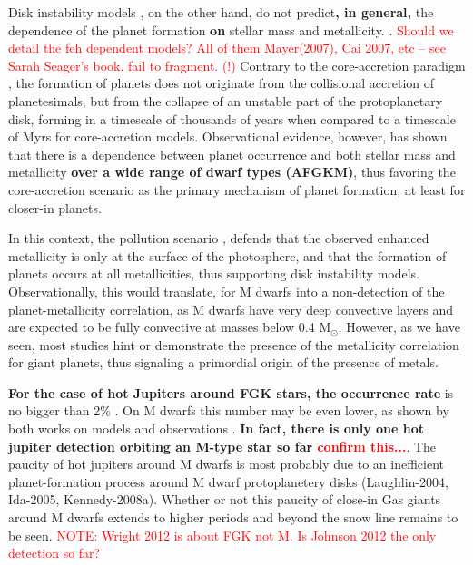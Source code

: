 \documentclass[structabstract]{aa}
\begin{document}
Disk instability models \citep[e.g.][]{Boss-1997}, on the other hand, do not predict\textbf{, in general,} the dependence of the planet formation \textbf{on} stellar mass \citep[e.g.][]{Boss-2006a} and metallicity. \citep{Boss-2002}. \textcolor{red}{Should we detail the feh dependent models? All of them Mayer(2007), Cai 2007, etc -- see Sarah Seager's book. fail to fragment. (!)}
Contrary to the core-accretion paradigm \citep{Pollack-1996}, the formation of planets does not originate from the collisional accretion of planetesimals, but from the collapse of an unstable part of the protoplanetary disk, forming in a timescale of thousands of years when compared to a timescale of Myrs for core-accretion models. Observational evidence, however, has shown that there is a dependence between planet occurrence and both stellar mass and metallicity \citep[e.g.][]{Johnson-2010} \textbf{over a wide range of dwarf types (AFGKM)}, thus favoring the core-accretion scenario as the primary mechanism of planet formation, at least for closer-in planets. 

In this context, the pollution scenario \citep[e.g.][]{Murray-2002,Gonzalez-1997}, defends that the observed enhanced metallicity is only at the surface of the photosphere, and that the formation of planets occurs at all metallicities, thus supporting disk instability models. Observationally, this would translate, for M dwarfs into a non-detection of the planet-metallicity correlation, as M dwarfs have very deep convective layers and are expected to be fully convective at masses below 0.4 M$_{\odot}$. However, as we have seen, most studies hint or demonstrate the presence of the metallicity correlation for giant planets, thus signaling a primordial origin of the presence of metals.

\textbf{For the case of hot Jupiters around FGK stars, the occurrence rate} is no bigger than 2\% \citep[e.g.][]{Howard-2010,Mayor-2011,Wright-2012}. On M dwarfs this number may be even lower, as shown by both works on models \citep[e.g.][]{Laughlin-2004,Ida-2005, Kennedy-2008a} and observations \citep[e.g.][]{Endl-2006, Cumming-2008,Johnson-2010,Bonfils-2011}. \textbf{In fact, there is only one hot jupiter detection orbiting an M-type star so far \citep{Johnson-2012}\textcolor{red}{confirm this...}}. The paucity of hot jupiters around M dwarfs is most probably due to an inefficient planet-formation process around M dwarf protoplanetery disks (Laughlin-2004, Ida-2005, Kennedy-2008a). Whether or not this paucity of close-in Gas giants around M dwarfs extends to higher periods and beyond the snow line remains to be seen. \textcolor{red}{NOTE: Wright 2012 is about FGK not M. Is Johnson 2012 the only detection so far?
}
\end{document}
